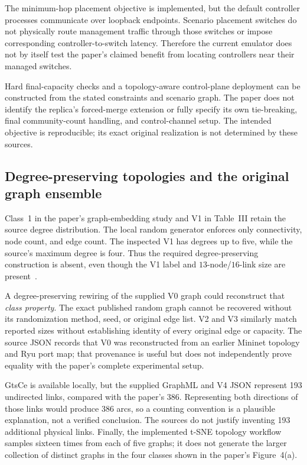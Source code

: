 \documentclass[11pt,a4paper]{article}
\begin{document}
The minimum-hop placement objective is implemented, but the default controller
processes communicate over loopback endpoints. Scenario placement switches do
not physically route management traffic through those switches or impose
corresponding controller-to-switch latency. Therefore the current emulator
does not by itself test the paper's claimed benefit from locating controllers
near their managed switches.

Hard final-capacity checks and a topology-aware control-plane deployment can
be constructed from the stated constraints and scenario graph. The paper
does not identify the replica's forced-merge extension or fully specify its
own tie-breaking, final community-count handling, and control-channel setup.
The intended objective is reproducible; its exact original realization is not
determined by these sources.

\subsection{Degree-preserving topologies and the original graph ensemble}

Class~1 in the paper's graph-embedding study and V1 in Table~III retain the
source degree distribution. The local random generator enforces only
connectivity, node count, and edge count. The inspected V1 has degrees up to
five, while the source's maximum degree is four. Thus the required
degree-preserving construction is absent, even though the V1 label and
$13$-node/$16$-link size are present~\cite{paper,code-network}.

A degree-preserving rewiring of the supplied V0 graph could reconstruct that
\emph{class property}. The exact published random graph cannot be recovered
without its randomization method, seed, or original edge list. V2 and V3
similarly match reported sizes without establishing identity of every original
edge or capacity. The source JSON records that V0 was reconstructed from an
earlier Mininet topology and Ryu port map; that provenance is useful but does
not independently prove equality with the paper's complete experimental setup.

GtsCe is available locally, but the supplied GraphML and V4 JSON represent
193 undirected links, compared with the paper's 386. Representing both
directions of those links would produce 386 arcs, so a counting convention is
a plausible explanation, not a verified conclusion. The sources do not justify
inventing 193 additional physical links. Finally, the implemented t-SNE
topology workflow samples sixteen times from each of five graphs; it does not
generate the larger collection of distinct graphs in the four classes shown
in the paper's Figure~4(a).
\end{document}
